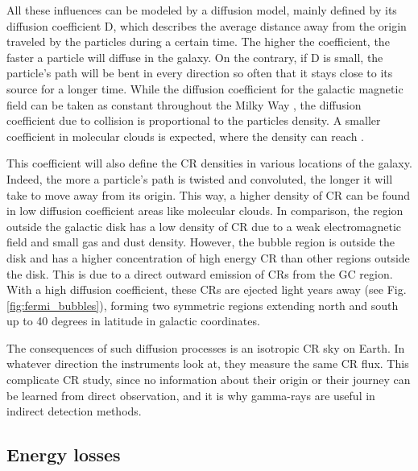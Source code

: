  All these influences can be modeled by a diffusion model, mainly defined by its diffusion coefficient D, which describes the average distance away from the origin traveled by the particles during a certain time. The higher the coefficient, the faster a particle will diffuse in the galaxy. On the contrary, if D is small, the particle's path will be bent in every direction so often that it stays close to its source for a longer time. 
While the diffusion coefficient for the galactic magnetic field can be taken as constant throughout the Milky Way , the diffusion coefficient due to collision is proportional to the particles density. A smaller coefficient in molecular clouds is expected, where the density can reach . 

This coefficient will also define the CR densities in various locations of the galaxy. Indeed, the more a particle's path is twisted and convoluted, the longer it will take to move away from its origin. This way, a higher density of CR can be found in low diffusion coefficient areas like molecular clouds. In comparison, the region outside the galactic disk has a low density of CR due to a weak electromagnetic field and small gas and dust density. 
However, the bubble region is outside the disk and has a higher concentration of high energy CR than other regions outside the disk. This is due to a direct outward emission of CRs from the GC region. With a high diffusion coefficient, these CRs are ejected light years away (see Fig. \ref{fig:fermi_bubbles}), forming two symmetric regions extending north and south up to 40 degrees in latitude in galactic coordinates. 

The consequences of such diffusion processes is an isotropic CR sky on Earth. In whatever direction the instruments look at, they measure the same CR flux. This complicate CR study, since no information about their origin or their journey can be learned from direct observation, and it is why gamma-rays are useful in indirect detection methods.

\subsection{Energy losses}

